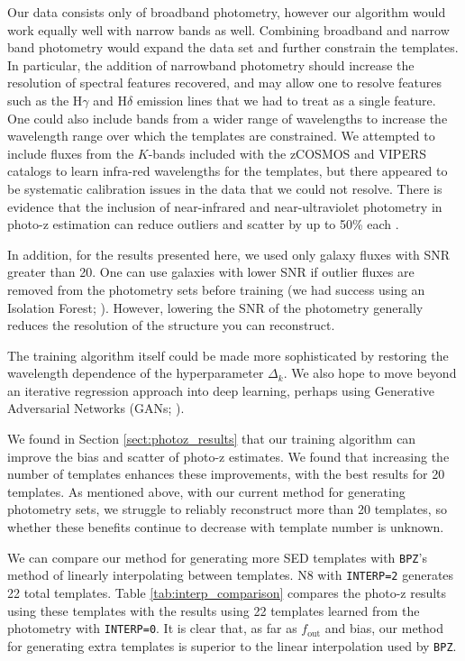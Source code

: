 \documentclass[twocolumn]{aastex63}
\newcommand{\pzcode}[1]{\texttt{#1}}
\newcommand{\bpz}{\pzcode{BPZ}}
\begin{document}
    Our data consists only of broadband photometry, however our algorithm would work equally well with narrow bands as well.
    Combining broadband and narrow band photometry would expand the data set and further constrain the templates.
    In particular, the addition of narrowband photometry should increase the resolution of spectral features recovered, and may allow one to resolve features such as the H$\gamma$ and H$\delta$ emission lines that we had to treat as a single feature.
    One could also include bands from a wider range of wavelengths to increase the wavelength range over which the templates are constrained.
    We attempted to include fluxes from the $K$-bands included with the zCOSMOS and VIPERS catalogs to learn  infra-red wavelengths for the templates, but there appeared to be systematic calibration issues in the data that we could not resolve.
    There is evidence that the inclusion of near-infrared and near-ultraviolet photometry in photo-z estimation can reduce outliers and scatter by up to 50\% each \citep{Graham2020}.

    In addition, for the results presented here, we used only galaxy fluxes with SNR greater than 20.
    One can use galaxies with lower SNR if outlier fluxes are removed from the photometry sets before training (we had success using an Isolation Forest; \citealt{Ting2008,Liu2012}).
    However, lowering the SNR of the photometry generally reduces the resolution of the structure you can reconstruct.

    The training algorithm itself could be made more sophisticated by restoring the wavelength dependence of the hyperparameter $\Delta_k$.
    We also hope to move beyond an iterative regression approach into deep learning, perhaps using Generative Adversarial Networks (GANs; \citealt{Goodfellow2014}).

    We found in Section \ref{sect:photoz_results} that our training algorithm can improve the bias and scatter of photo-z estimates.
    We found that increasing the number of templates enhances these improvements, with the best results for 20 templates.
    As mentioned above, with our current method for generating photometry sets, we struggle to reliably reconstruct more than 20 templates, so whether these benefits continue to decrease with template number is unknown.

    We can compare our method for generating more SED templates with \bpz's method of linearly interpolating between templates.
    N8 with \texttt{INTERP=2} generates 22 total templates.
    Table \ref{tab:interp_comparison} compares the photo-z results using these templates with the results using 22 templates learned from the photometry with \texttt{INTERP=0}.
    It is clear that, as far as $f_\text{out}$ and bias, our method for generating extra templates is superior to the linear interpolation used by \bpz. 
\end{document}
